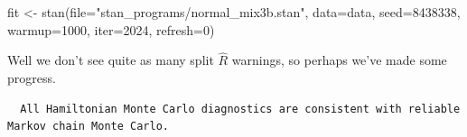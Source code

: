 \documentclass[
  letterpaper,
  DIV=11,
  numbers=noendperiod]{scrartcl}
\newenvironment{Shaded}{\begin{snugshade}}{\end{snugshade}}
\newcommand{\AttributeTok}[1]{\textcolor[rgb]{0.40,0.45,0.13}{#1}}
\newcommand{\ConstantTok}[1]{\textcolor[rgb]{0.56,0.35,0.01}{#1}}
\newcommand{\DecValTok}[1]{\textcolor[rgb]{0.68,0.00,0.00}{#1}}
\newcommand{\FunctionTok}[1]{\textcolor[rgb]{0.28,0.35,0.67}{#1}}
\newcommand{\NormalTok}[1]{\textcolor[rgb]{0.00,0.23,0.31}{#1}}
\newcommand{\OtherTok}[1]{\textcolor[rgb]{0.00,0.23,0.31}{#1}}
\newcommand{\SpecialCharTok}[1]{\textcolor[rgb]{0.37,0.37,0.37}{#1}}
\newcommand{\StringTok}[1]{\textcolor[rgb]{0.13,0.47,0.30}{#1}}
\begin{document}
\begin{Shaded}
\begin{Highlighting}[]
\NormalTok{fit }\OtherTok{\textless{}{-}} \FunctionTok{stan}\NormalTok{(}\AttributeTok{file=}\StringTok{"stan\_programs/normal\_mix3b.stan"}\NormalTok{,}
            \AttributeTok{data=}\NormalTok{data, }\AttributeTok{seed=}\DecValTok{8438338}\NormalTok{,}
            \AttributeTok{warmup=}\DecValTok{1000}\NormalTok{, }\AttributeTok{iter=}\DecValTok{2024}\NormalTok{, }\AttributeTok{refresh=}\DecValTok{0}\NormalTok{)}
\end{Highlighting}
\end{Shaded}

Well we don't see quite as many split \(\hat{R}\) warnings, so perhaps
we've made some progress.

\begin{Shaded}
\end{Shaded}

\begin{verbatim}
  All Hamiltonian Monte Carlo diagnostics are consistent with reliable
Markov chain Monte Carlo.
\end{verbatim}

\begin{Shaded}
\end{Shaded}
\end{document}
